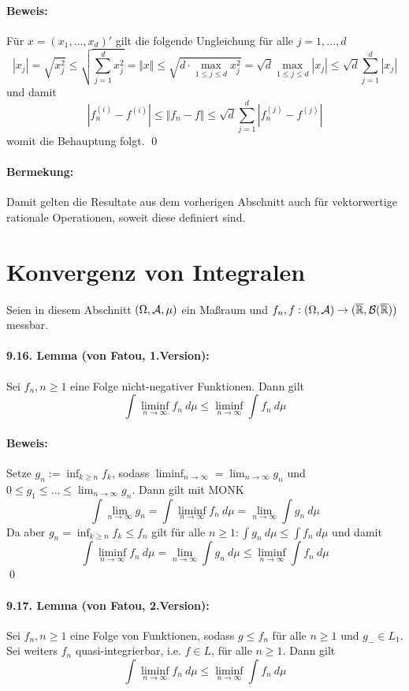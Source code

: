 \documentclass[11pt]{report}
\begin{document}
\paragraph{Beweis:} F\"ur $x=(x_1,\hdots,x_d)'$ gilt die folgende Ungleichung f\"ur alle $j=1,\hdots,d$
$$|x_j|=\sqrt{x_j^2}\leq\sqrt{\sum_{j=1}^dx_j^2}=\Vert x\Vert\leq\sqrt{d\cdot\max_{1\leq j\leq d}x_j^2}=\sqrt{d}\max_{1\leq j\leq d}|x_j|\leq\sqrt{d}\sum_{j=1}^d|x_j|$$
und damit
$$|f_n^{(i)}-f^{(i)}|\leq\Vert f_n-f\Vert\leq\sqrt{d}\sum_{j=1}^d|f_n^{(j)}-f^{(j)}|$$
womit die Behauptung folgt. \qed

\paragraph{Bermekung:} Damit gelten die Resultate aus dem vorherigen Abschnitt auch f\"ur vektorwertige rationale Operationen, soweit diese definiert sind.

\section*{Konvergenz von Integralen}
Seien in diesem Abschnitt $(\Omega,\mathcal{A},\mu)$ ein Ma\ss{}raum und $f_n,f:(\Omega,\mathcal{A})\to(\overline{\mathbb{R}},\mathcal{B}(\overline{\mathbb{R}}))$ messbar.

\paragraph{9.16. Lemma (von Fatou, 1.Version):}Sei $f_n,n\geq1$ eine Folge nicht-negativer Funktionen. Dann gilt
$$\int\liminf_{n\to\infty}f_n\ d\mu\leq\liminf_{n\to\infty}\int f_n\ d\mu$$

\paragraph{Beweis:}Setze $g_n:=\inf_{k\geq n}f_k$, sodass $\liminf_{n\to\infty}=\lim_{n\to\infty}g_n$ und $0\leq g_1\leq\hdots\leq \lim_{n\to\infty}g_n$. Dann gilt mit MONK
$$\int\lim_{n\to\infty}g_n=\int\liminf_{n\to\infty}f_n\ d\mu=\lim_{n\to\infty}\int g_n\ d\mu$$
Da aber $g_n=\inf_{k\geq n}f_k\leq f_n$ gilt f\"ur alle $n\geq1:\int g_n\ d\mu\leq\int f_n\ d\mu$
und damit 
$$\int\liminf_{n\to\infty}f_n\ d\mu=\lim_{n\to\infty}\int g_n\ d\mu\leq\liminf_{n\to\infty}\int f_n\ d\mu$$
\qed

\paragraph{9.17. Lemma (von Fatou, 2.Version):}Sei $f_n,n\geq1$ eine Folge von Funktionen, sodass $g\leq f_n$ f\"ur alle $n\geq1$ und $g_-\in L_1$. Sei weiters $f_n$ quasi-integrierbar, i.e. $f\in L$, f\"ur alle $n\geq1$. Dann gilt
$$\int\liminf_{n\to\infty}f_n\ d\mu\leq\liminf_{n\to\infty}\int f_n\ d\mu$$
\end{document}
